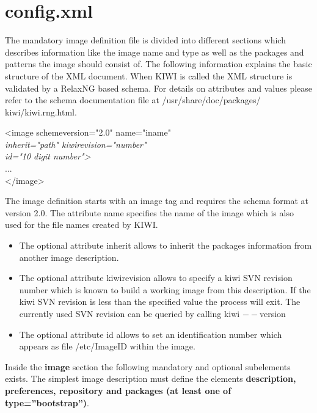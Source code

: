 \section{config.xml}
The mandatory image definition file is divided into different sections
which describes information like the image name and type as well as
the packages and patterns the image should consist of. The following
information explains the basic structure of the XML document. When KIWI
is called the XML structure is validated by a RelaxNG based schema.
For details on attributes and values please refer to the schema 
documentation file at /usr/share/doc/packages/ kiwi/kiwi.rng.html.

\begin{Command}{12cm}
<image schemeversion="2.0" name="iname"\\
\hspace*{1.9cm}\textit{inherit="path" kiwirevision="number"}\\
\hspace*{1.9cm}\textit{id="10 digit number">}\\
\hspace*{1cm}...\\
</image>
\end{Command}

The image definition starts with an image tag and requires the
schema format at version 2.0. The attribute name specifies the
name of the image which is also used for the file names created
by KIWI.

\begin{itemize}
\item The optional attribute inherit allows to inherit the
      packages information from another image description.
\item The optional attribute kiwirevision allows to specify
      a kiwi SVN revision number which is known to build
      a working image from this description. If the kiwi SVN
      revision is less than the specified value the
      process will exit. The currently used SVN revision can
      be queried by calling kiwi $--$version
\item The optional attribute id allows to set an identification
      number which appears as file /etc/ImageID within the
      image.
\end{itemize}

Inside the \textbf{image} section the following mandatory and optional
subelements exists. The simplest image description must define the
elements \textbf{description, preferences, repository and
packages (at least one of type=''bootstrap'')}.

